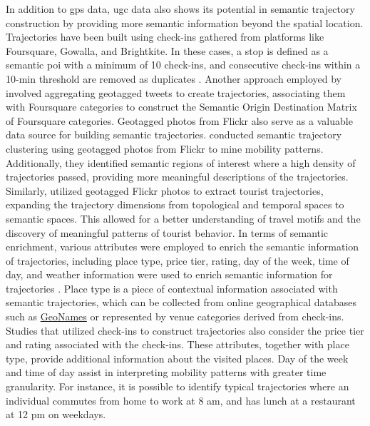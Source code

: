 \documentclass{article}
\theoremstyle{remark}
\begin{document}
In addition to \acrshort{gps} data, \acrshort{ugc} data also shows its potential in semantic trajectory construction by providing more semantic information beyond the spatial location. Trajectories have been built using check-ins gathered from platforms like Foursquare, Gowalla, and Brightkite. In these cases, a stop is defined as a semantic \acrshort{poi} with a minimum of 10 check-ins, and consecutive check-ins within a 10-min threshold are removed as duplicates \citep{petry_towards_2019,ferrero_mastermovelets_2020}. Another approach employed by \cite{nin_tweets_2014} involved aggregating geotagged tweets to create trajectories, associating them with Foursquare categories to construct the Semantic Origin Destination Matrix of Foursquare categories. Geotagged photos from Flickr also serve as a valuable data source for building semantic trajectories. \cite{cai_mining_2018} conducted semantic trajectory clustering using geotagged photos from Flickr to mine mobility patterns. Additionally, they identified semantic regions of interest where a high density of trajectories passed, providing more meaningful descriptions of the trajectories. Similarly, \cite{yang_quantifying_2017} utilized geotagged Flickr photos to extract tourist trajectories, expanding the trajectory dimensions from topological and temporal spaces to semantic spaces. This allowed for a better understanding of travel motifs and the discovery of meaningful patterns of tourist behavior. In terms of semantic enrichment, various attributes were employed to enrich the semantic information of trajectories, including place type, price tier, rating, day of the week, time of day, and weather information were used to enrich semantic information for trajectories \citep{cai_mining_2018,petry_towards_2019,ferrero_mastermovelets_2020}. Place type is a piece of contextual information associated with semantic trajectories, which can be collected from online geographical databases such as \href{http://www.geonames.org/}{GeoNames} or represented by venue categories derived from check-ins. Studies that utilized check-ins to construct trajectories also consider the price tier and rating associated with the check-ins. These attributes, together with place type, provide additional information about the visited places. Day of the week and time of day assist in interpreting mobility patterns with greater time granularity. For instance, it is possible to identify typical trajectories where an individual commutes from home to work at 8 am, and has lunch at a restaurant at 12 pm on weekdays.
\end{document}
